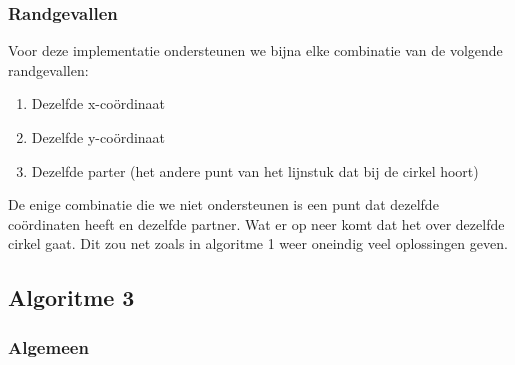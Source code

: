 \documentclass[11pt,a4paper]{article}
\begin{document}
\subsubsection{Randgevallen}
Voor deze implementatie ondersteunen we bijna elke combinatie van de volgende randgevallen:
\begin{enumerate}
\item Dezelfde x-co\"ordinaat
\item Dezelfde y-co\"ordinaat
\item Dezelfde parter (het andere punt van het lijnstuk dat bij de cirkel hoort)
\end{enumerate}
De enige combinatie die we niet ondersteunen is een punt dat dezelfde co\"ordinaten heeft en dezelfde partner. Wat er op neer komt dat het over dezelfde cirkel gaat. Dit zou net zoals in algoritme 1 weer oneindig veel oplossingen geven.
\subsection{Algoritme 3}
\subsubsection{Algemeen}
\end{document}
